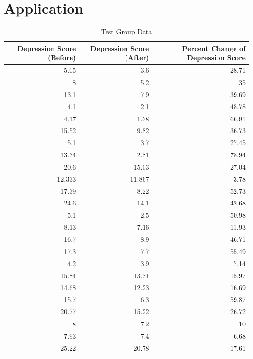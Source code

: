\documentclass[12pt]{article}
\begin{document}
 \section{Application} 
 \label{sec:application}

 \begin{table}[hbt!]
    \small
    \caption{Test Group Data}
    \label{tab:1}
  \centering
  \begin{tabular}{rrr}
      \toprule
  Depression Score (Before) & Depression Score (After) & Percent Change of Depression Score \\ 
    \midrule
     5.05 & 3.6 & 28.71\\ 
     8 & 5.2 & 35\\ 
     13.1 & 7.9 & 39.69\\ 
     4.1 & 2.1 & 48.78\\ 
     4.17 & 1.38 & 66.91\\ 
     15.52 & 9.82 & 36.73\\  
     5.1 & 3.7 & 27.45\\
     13.34 & 2.81 & 78.94\\
     20.6 & 15.03 & 27.04\\
     12.333 & 11.867 & 3.78\\
     17.39 & 8.22 & 52.73\\
     24.6 & 14.1 & 42.68\\
     5.1 & 2.5 & 50.98\\
     8.13 & 7.16 & 11.93\\
     16.7 & 8.9 & 46.71\\
     17.3 & 7.7 & 55.49\\
     4.2 & 3.9 & 7.14\\
     15.84 & 13.31 & 15.97\\
     14.68 & 12.23 & 16.69\\
     15.7 & 6.3 & 59.87\\
     20.77 & 15.22 & 26.72\\
     8 & 7.2 & 10\\
     7.93 & 7.4 & 6.68\\
     25.22 & 20.78 & 17.61\\
     \bottomrule
  \end{tabular}
  \end{table}
  
\end{document}
